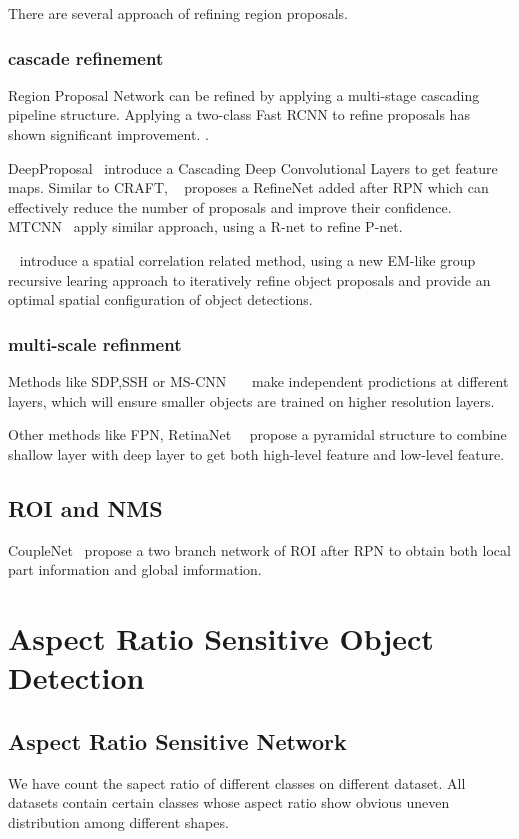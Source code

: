 \documentclass[10pt,twocolumn,letterpaper]{article}
\begin{document}
There are several approach of refining region proposals.

\subsubsection{cascade refinement}
Region Proposal Network can be refined by applying a multi-stage cascading pipeline structure. Applying a two-class Fast RCNN to refine proposals has shown significant improvement. \cite{CRAFT} \cite{CraftingGBD} \cite{DeepBox}.  

DeepProposal~\cite{DeepProposal} introduce a Cascading Deep Convolutional Layers to get feature maps. Similar to CRAFT, ~\cite{Cascadedcnn} proposes a RefineNet added after RPN which can effectively reduce the number of proposals and improve their confidence. MTCNN~\cite{MTCNN} apply similar approach, using a R-net to refine P-net.

~\cite{GroupRecursive} introduce a spatial correlation related method, using a new EM-like group recursive learing approach to iteratively refine object proposals and provide an optimal spatial configuration of object detections.
\subsubsection{multi-scale refinment}
Methods like SDP,SSH or MS-CNN ~\cite{SDP}~\cite{SSH}~\cite{MSCNN}make independent prodictions at different layers, which will ensure smaller objects are trained on higher resolution layers.


Other methods like FPN, RetinaNet~\cite{FPN}~\cite{RetinaNet} propose a pyramidal structure to combine shallow layer with deep layer to get both high-level feature and low-level feature.

\subsection{ROI and NMS}
CoupleNet~\cite{CoupleNet} propose a two branch network of ROI after RPN to obtain both local part information and global imformation.



\section{Aspect Ratio Sensitive Object Detection}
\subsection{Aspect Ratio Sensitive Network}
We have count the sapect ratio of different classes on different dataset. All datasets contain certain classes whose aspect ratio show obvious uneven distribution among different shapes. 
\end{document}
